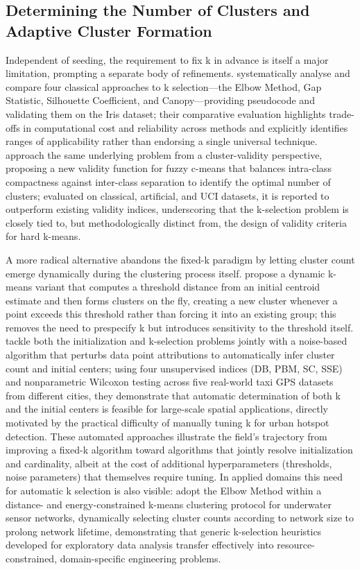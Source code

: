 \subsection{Determining the Number of Clusters and Adaptive Cluster Formation}
Independent of seeding, the requirement to fix k in advance is itself a major limitation, prompting a separate body of refinements. \cite{yuan2019research} systematically analyse and compare four classical approaches to k selection---the Elbow Method, Gap Statistic, Silhouette Coefficient, and Canopy---providing pseudocode and validating them on the Iris dataset; their comparative evaluation highlights trade-offs in computational cost and reliability across methods and explicitly identifies ranges of applicability rather than endorsing a single universal technique. \cite{zhu2019novel} approach the same underlying problem from a cluster-validity perspective, proposing a new validity function for fuzzy c-means that balances intra-class compactness against inter-class separation to identify the optimal number of clusters; evaluated on classical, artificial, and UCI datasets, it is reported to outperform existing validity indices, underscoring that the k-selection problem is closely tied to, but methodologically distinct from, the design of validity criteria for hard k-means.

A more radical alternative abandons the fixed-k paradigm by letting cluster count emerge dynamically during the clustering process itself. \cite{hossain2019dynamic} propose a dynamic k-means variant that computes a threshold distance from an initial centroid estimate and then forms clusters on the fly, creating a new cluster whenever a point exceeds this threshold rather than forcing it into an existing group; this removes the need to prespecify k but introduces sensitivity to the threshold itself. \cite{ran2021novel} tackle both the initialization and k-selection problems jointly with a noise-based algorithm that perturbs data point attributions to automatically infer cluster count and initial centers; using four unsupervised indices (DB, PBM, SC, SSE) and nonparametric Wilcoxon testing across five real-world taxi GPS datasets from different cities, they demonstrate that automatic determination of both k and the initial centers is feasible for large-scale spatial applications, directly motivated by the practical difficulty of manually tuning k for urban hotspot detection. These automated approaches illustrate the field's trajectory from improving a fixed-k algorithm toward algorithms that jointly resolve initialization and cardinality, albeit at the cost of additional hyperparameters (thresholds, noise parameters) that themselves require tuning. In applied domains this need for automatic k selection is also visible: \cite{omeke2021dekcs} adopt the Elbow Method within a distance- and energy-constrained k-means clustering protocol for underwater sensor networks, dynamically selecting cluster counts according to network size to prolong network lifetime, demonstrating that generic k-selection heuristics developed for exploratory data analysis transfer effectively into resource-constrained, domain-specific engineering problems.

